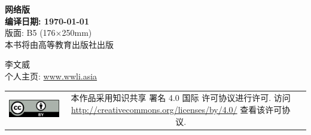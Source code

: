 \begin{titlepage}
\clearpage	%
\thispagestyle{empty}
\begin{center}
	\Large{\sffamily\bfseries\thmheiti 网络版} \\ \vspace{2em}
	\Large{\sffamily\bfseries\thmheiti 编译日期: \today} \\ \vspace{1em}
	版面: B5 (176×250mm) \\ \vspace{1em}
	本书将由高等教育出版社出版
\end{center}
\vfill

\begin{flushleft} \small
	李文威 \\
	个人主页: \href{https://www.wwli.asia}{www.wwli.asia}
\end{flushleft}
\vspace{1.5em}
\begin{tabular*}{\textwidth}{ccc}
	\includegraphics{ccby.png}
	& \begin{minipage}[b]{0.6\textwidth}
		\small\sffamily
		本作品采用知识共享 署名 4.0 国际 许可协议进行许可. 访问 \url{http://creativecommons.org/licenses/by/4.0/} 查看该许可协议.
	\end{minipage}
\end{tabular*}

\cleardoublepage
\end{titlepage}
